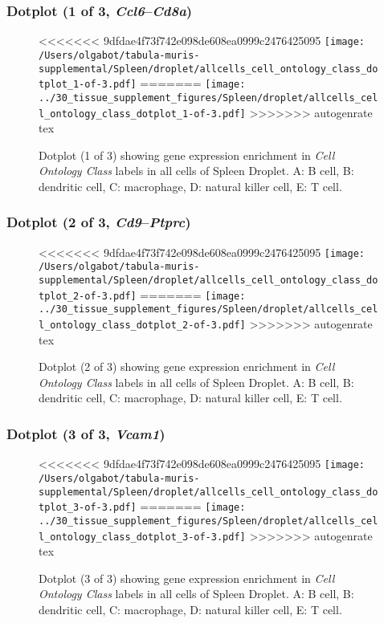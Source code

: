 \clearpage

\subsubsection{Dotplot (1 of 3, \emph{Ccl6}--\emph{Cd8a})}
\begin{figure}[h]
\centering
<<<<<<< 9dfdae4f73f742e098de608ea0999c2476425095
\texttt{[image: /Users/olgabot/tabula-muris-supplemental/Spleen/droplet/allcells\_cell\_ontology\_class\_dotplot\_1-of-3.pdf]}
=======
\texttt{[image: ../30\_tissue\_supplement\_figures/Spleen/droplet/allcells\_cell\_ontology\_class\_dotplot\_1-of-3.pdf]}
>>>>>>> autogenrate tex

\caption{ Dotplot (1 of 3)  showing gene expression enrichment in \emph{Cell Ontology Class} labels in all cells of Spleen Droplet. A: B cell, B: dendritic cell, C: macrophage, D: natural killer cell, E: T cell.}
\end{figure}


\clearpage

\subsubsection{Dotplot (2 of 3, \emph{Cd9}--\emph{Ptprc})}
\begin{figure}[h]
\centering
<<<<<<< 9dfdae4f73f742e098de608ea0999c2476425095
\texttt{[image: /Users/olgabot/tabula-muris-supplemental/Spleen/droplet/allcells\_cell\_ontology\_class\_dotplot\_2-of-3.pdf]}
=======
\texttt{[image: ../30\_tissue\_supplement\_figures/Spleen/droplet/allcells\_cell\_ontology\_class\_dotplot\_2-of-3.pdf]}
>>>>>>> autogenrate tex

\caption{ Dotplot (2 of 3)  showing gene expression enrichment in \emph{Cell Ontology Class} labels in all cells of Spleen Droplet. A: B cell, B: dendritic cell, C: macrophage, D: natural killer cell, E: T cell.}
\end{figure}


\clearpage

\subsubsection{Dotplot (3 of 3, \emph{Vcam1})}
\begin{figure}[h]
\centering
<<<<<<< 9dfdae4f73f742e098de608ea0999c2476425095
\texttt{[image: /Users/olgabot/tabula-muris-supplemental/Spleen/droplet/allcells\_cell\_ontology\_class\_dotplot\_3-of-3.pdf]}
=======
\texttt{[image: ../30\_tissue\_supplement\_figures/Spleen/droplet/allcells\_cell\_ontology\_class\_dotplot\_3-of-3.pdf]}
>>>>>>> autogenrate tex

\caption{ Dotplot (3 of 3)  showing gene expression enrichment in \emph{Cell Ontology Class} labels in all cells of Spleen Droplet. A: B cell, B: dendritic cell, C: macrophage, D: natural killer cell, E: T cell.}
\end{figure}


